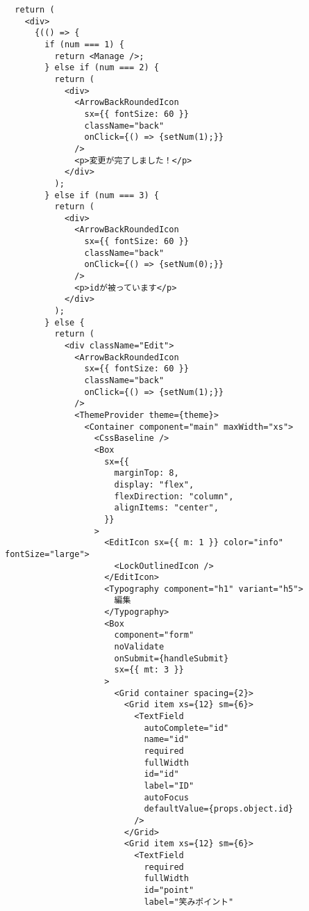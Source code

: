 \begin{verbatim}
  return (
    <div>
      {(() => {
        if (num === 1) {
          return <Manage />;
        } else if (num === 2) {
          return (
            <div>
              <ArrowBackRoundedIcon
                sx={{ fontSize: 60 }}
                className="back"
                onClick={() => {setNum(1);}}
              />
              <p>変更が完了しました！</p>
            </div>
          );
        } else if (num === 3) {
          return (
            <div>
              <ArrowBackRoundedIcon
                sx={{ fontSize: 60 }}
                className="back"
                onClick={() => {setNum(0);}}
              />
              <p>idが被っています</p>
            </div>
          );
        } else {
          return (
            <div className="Edit">
              <ArrowBackRoundedIcon
                sx={{ fontSize: 60 }}
                className="back"
                onClick={() => {setNum(1);}}
              />
              <ThemeProvider theme={theme}>
                <Container component="main" maxWidth="xs">
                  <CssBaseline />
                  <Box
                    sx={{
                      marginTop: 8,
                      display: "flex",
                      flexDirection: "column",
                      alignItems: "center",
                    }}
                  >
                    <EditIcon sx={{ m: 1 }} color="info" fontSize="large">
                      <LockOutlinedIcon />
                    </EditIcon>
                    <Typography component="h1" variant="h5">
                      編集
                    </Typography>
                    <Box
                      component="form"
                      noValidate
                      onSubmit={handleSubmit}
                      sx={{ mt: 3 }}
                    >
                      <Grid container spacing={2}>
                        <Grid item xs={12} sm={6}>
                          <TextField
                            autoComplete="id"
                            name="id"
                            required
                            fullWidth
                            id="id"
                            label="ID"
                            autoFocus
                            defaultValue={props.object.id}
                          />
                        </Grid>
                        <Grid item xs={12} sm={6}>
                          <TextField
                            required
                            fullWidth
                            id="point"
                            label="笑みポイント"

\end{verbatim}
